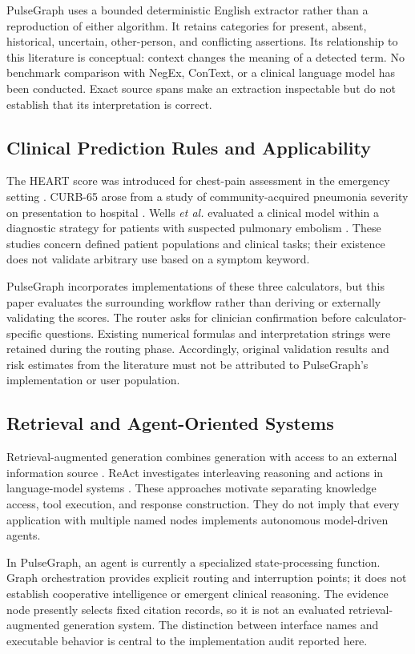 \documentclass[conference]{IEEEtran}
\begin{document}
PulseGraph uses a bounded deterministic English extractor rather than a reproduction of either algorithm. It retains categories for present, absent, historical, uncertain, other-person, and conflicting assertions. Its relationship to this literature is conceptual: context changes the meaning of a detected term. No benchmark comparison with NegEx, ConText, or a clinical language model has been conducted. Exact source spans make an extraction inspectable but do not establish that its interpretation is correct.

\subsection{Clinical Prediction Rules and Applicability}
The HEART score was introduced for chest-pain assessment in the emergency setting \cite{heart}. CURB-65 arose from a study of community-acquired pneumonia severity on presentation to hospital \cite{curb}. Wells \emph{et al.} evaluated a clinical model within a diagnostic strategy for patients with suspected pulmonary embolism \cite{wells}. These studies concern defined patient populations and clinical tasks; their existence does not validate arbitrary use based on a symptom keyword.

PulseGraph incorporates implementations of these three calculators, but this paper evaluates the surrounding workflow rather than deriving or externally validating the scores. The router asks for clinician confirmation before calculator-specific questions. Existing numerical formulas and interpretation strings were retained during the routing phase. Accordingly, original validation results and risk estimates from the literature must not be attributed to PulseGraph's implementation or user population.

\subsection{Retrieval and Agent-Oriented Systems}
Retrieval-augmented generation combines generation with access to an external information source \cite{rag}. ReAct investigates interleaving reasoning and actions in language-model systems \cite{react}. These approaches motivate separating knowledge access, tool execution, and response construction. They do not imply that every application with multiple named nodes implements autonomous model-driven agents.

In PulseGraph, an agent is currently a specialized state-processing function. Graph orchestration provides explicit routing and interruption points; it does not establish cooperative intelligence or emergent clinical reasoning. The evidence node presently selects fixed citation records, so it is not an evaluated retrieval-augmented generation system. The distinction between interface names and executable behavior is central to the implementation audit reported here.
\end{document}
